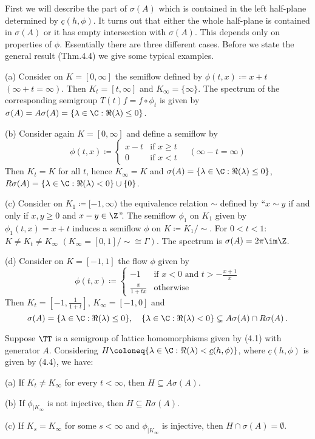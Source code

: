 First we will describe the part of $\sigma(A)$ which is contained in the left half-plane determined by $\underline{c}(h,\phi)$.
It turns out that either the whole half-plane is contained in $\sigma(A)$ or it has empty intersection with $\sigma(A)$.
This depends only on properties of $\phi$.
Essentially there
%
%
%
%
%
are three different cases. 
Before we state the general result (Thm.4.4) we give some typical examples.
\begin{examples}\label{ex:b3-4.3}
	
	(a) Consider on $K = [0,\infty]$ the semiflow defined by $\phi(t,x) \coloneq x + t$ $(\infty + t = \infty)$.
	Then $K_{t} = [t,\infty]$ and $K_{\infty} = \{\infty\}$.
	The spectrum of the corresponding semigroup $T(t)f = f\circ\phi_{t}$ is given by $\sigma(A) = A\sigma(A) = \{\lambda \in \C : \Re(\lambda) \leq 0\}$.
	
	(b) Consider again $K = [0,\infty]$ and define a semiflow by
	\[
	\phi(t,x) \coloneq \begin{cases} 
		x - t & \text{if } x \geq t \\
		0 & \text{if } x < t
	\end{cases} \quad (\infty - t = \infty)
	\]
	Then $K_{t} = K$ for all $t$, hence $K_{\infty} = K$ and $\sigma(A) = \{\lambda \in \C : \Re(\lambda) \leq 0\}$, $R\sigma(A) = \{\lambda \in \C : \Re(\lambda) < 0\} \cup \{0\}$.
	
	(c) Consider on $K_{1} \coloneq [-1,\infty)$ the equivalence relation $\sim$ defined by \enquote{$x \sim y$ if and only if $x,y \geq 0$ and $x - y \in \Z$}.
	The semiflow $\phi_{1}$ on $K_{1}$ given by $\phi_{1}(t,x) = x + t$ induces a semiflow $\phi$ on $K \coloneq K_{1}/{\sim}$.
	For $0 < t < 1$: $K \neq K_{t} \neq K_{\infty}$ $(K_{\infty} = [0,1]/{\sim} \cong \Gamma)$.
	The spectrum is $\sigma(A) = 2\pi \im\Z$.
	
	(d) Consider on $K = [-1,1]$ the flow $\phi$ given by
	\[
	\phi(t,x)\coloneq \begin{cases}
		-1 & \text{if } x < 0 \text{ and } t > -\frac{x+1}{x} \\
		\frac{x}{1+tx} & \text{otherwise}
	\end{cases}
	\]
	Then $K_{t} = [-1,\frac{1}{1+t}]$, $K_{\infty} = [-1,0]$ and
	\[
	\sigma(A) = \{\lambda \in \C : \Re(\lambda) \leq 0\},\quad 
	\{\lambda \in \C : \Re(\lambda) < 0\} \subsetneq A\sigma(A)\cap R\sigma(A)\,.
	\]
\end{examples}
\begin{theorem}\label{thm:b3-4.4}
	Suppose $\TT$ is a semigroup of lattice homomorphisms given by (4.1) with generator $A$.
	Considering $H \coloneq \{\lambda \in \C : \Re(\lambda) < \underline{c}(h,\phi)\}$, where $\underline{c}(h,\phi)$ is given by (4.4), we have:
	
	(a) If $K_{t} \neq K_{\infty}$ for every $t < \infty$, then $H \subseteq A\sigma(A)$.
	
	(b) If $\phi_{|K_{\infty}}$ is not injective, then $H \subseteq R\sigma(A)$.
	
	(c) If $K_{s} = K_{\infty}$ for some $s < \infty$ and $\phi_{|K_{\infty}}$ is injective, then $H\cap\sigma(A) = \emptyset$.
\end{theorem}
